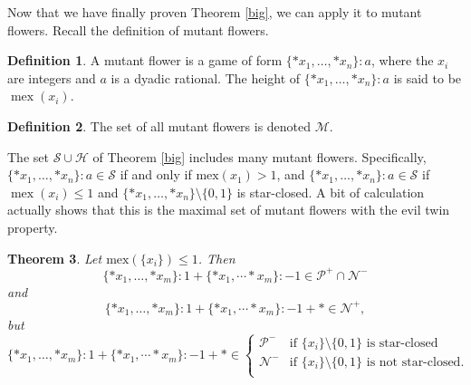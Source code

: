 \documentclass{amsart}
\theoremstyle{plain}
\newtheorem{thm}{Theorem}
\theoremstyle{definition}
\newtheorem{defn}[thm]{Definition}
\theoremstyle{remark}
\numberwithin{equation}{section}
\numberwithin{thm}{section}
\DeclareMathOperator{\mex}{mex}
\begin{document}
Now that we have finally proven Theorem \ref{big}, we can apply it to mutant flowers. Recall the definition of mutant flowers. \begin{defn}
    A mutant flower is a game of form $\{*x_1,\dots,*x_n\}:a$, where the $x_i$ are integers and $a$ is a dyadic rational. The height of $\{*x_1,\dots,*x_n\}:a$ is said to be  $\mex(x_i)$.
\end{defn}
\begin{defn}
    The set of all mutant flowers is denoted $\mathscr{M}$. 
\end{defn}
The set $\mathscr{S} \cup \mathscr{H}$ of Theorem \ref{big} includes many mutant flowers.
 Specifically, $\{*x_1,\dots,*x_n\}:a \in \mathscr{S}$ if and only if $\text{mex}({x_1}) >1$, and $\{*x_1,\dots,*x_n\}:a \in \mathscr{S}$ if $\mex(x_i) \leq 1$ and $\{*x_1,\dots,*x_n\} \setminus \{0,1\}$ is star-closed.
A bit of calculation actually shows that this is the maximal set of mutant flowers with the evil twin property.\begin{thm}
  Let $\text{mex}(\{x_i\})\leq1$. Then
    \begin{equation}
        \{*x_1,\dots ,*x_m\}:1 + \{*x_1,\dotsm*x_m\}:-1 \in  \mathcal{P}^+ \cap \mathcal{N}^-
    \end{equation}
    and \begin{equation}
     \{*x_1,\dots ,*x_m\}:1 + \{*x_1,\dotsm*x_m\}:-1 + *\in  \mathcal{N}^+,
    \end{equation}
    but \begin{equation}
          \{*x_1,\dots ,*x_m\}:1 + \{*x_1,\dotsm*x_m\}:-1+*\in  \begin{cases}
              \mathcal{P}^- & \text{if } \{x_i\} \setminus \{0,1\} \text{ is star-closed}\\
              \mathcal{N}^-& \text{if } \{x_i\} \setminus \{0,1\} \text{ is not star-closed}. \\
          \end{cases}
    \end{equation}
\end{thm}
\end{document}
